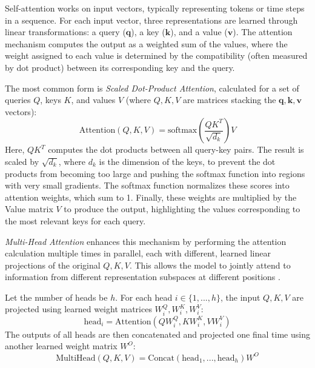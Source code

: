 Self-attention works on input vectors, typically representing tokens or time steps in a sequence. For each input vector, three representations are learned through linear transformations: a query (\( \bm{q} \)), a key (\( \bm{k} \)), and a value (\( \bm{v} \)). The attention mechanism computes the output as a weighted sum of the values, where the weight assigned to each value is determined by the compatibility (often measured by dot product) between its corresponding key and the query.

The most common form is \textit{Scaled Dot-Product Attention}, calculated for a set of queries \( Q \), keys \( K \), and values \( V \) (where \( Q, K, V \) are matrices stacking the \( \bm{q}, \bm{k}, \bm{v} \) vectors):
\begin{equation}
  \text{Attention}(Q, K, V) = \text{softmax}\left(\frac{QK^T}{\sqrt{d_k}}\right) V
  \label{eq:scaled_dot_product_attention}
\end{equation}
Here, \( QK^T \) computes the dot products between all query-key pairs. The result is scaled by \( \sqrt{d_k} \), where \( d_k \) is the dimension of the keys, to prevent the dot products from becoming too large and pushing the softmax function into regions with very small gradients. The softmax function normalizes these scores into attention weights, which sum to 1. Finally, these weights are multiplied by the Value matrix \( V \) to produce the output, highlighting the values corresponding to the most relevant keys for each query.

\textit{Multi-Head Attention} enhances this mechanism by performing the attention calculation multiple times in parallel, each with different, learned linear projections of the original \( Q, K, V \). This allows the model to jointly attend to information from different representation subspaces at different positions \autocite{vaswani2017attention}.

Let the number of heads be \( h \). For each head \( i \in \{1, ..., h\} \), the input \( Q, K, V \) are projected using learned weight matrices \( W^Q_i, W^K_i, W^V_i \):
\begin{equation}
  \text{head}_i = \text{Attention}(Q W^Q_i, K W^K_i, V W^V_i)
  \label{eq:attention_head_i}
\end{equation}
The outputs of all heads are then concatenated and projected one final time using another learned weight matrix \( W^O \):
\begin{equation}
  \text{MultiHead}(Q, K, V) = \text{Concat}(\text{head}_1, ..., \text{head}_h) W^O
  \label{eq:multihead_attention}
\end{equation}

